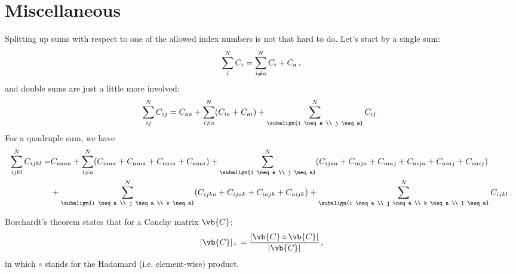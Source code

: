 \section{Miscellaneous}
    Splitting up sums with respect to one of the allowed index numbers is not that hard to do. Let's start by a single sum:
    \begin{equation}
        \sum_i^N C_i = \sum_{i \neq a}^N C_i + C_a \thinspace ,
    \end{equation}
    and double sums are just a little more involved:
    \begin{equation}
        \sum_{ij}^N C_{ij} = C_{aa}+ \sum_{i \neq a}^N (C_{ia} + C_{ai}) + \sum_{\subalign{i \neq a \\ j \neq a}}^N C_{ij} \thinspace .
    \end{equation}
    For a quadruple sum, we have
    \begin{equation}
        \begin{split}
            \sum_{ijkl}^N C_{ijkl} = &C_{aaaa} + \sum_{i \neq a}^N (C_{iaaa} + C_{aiaa} + C_{aaia} + C_{aaai}) + \sum_{\subalign{i \neq a \\ j \neq a}}^N (C_{ijaa} + C_{iaja} + C_{iaaj} + C_{aija} + C_{aiaj} + C_{aaij}) \\
            &+ \sum_{\subalign{i \neq a \\ j \neq a \\ k \neq a}}^N (C_{ijka} + C_{ijak} + C_{iajk} + C_{aijk}) + \sum_{\subalign{i \neq a \\ j \neq a \\ k \neq a \\ l \neq a}}^N C_{ijkl} \thinspace .
        \end{split}
    \end{equation}

    Borchardt's theorem states that for a Cauchy matrix $\vb{C}$:
    \begin{equation}
        |\vb{C}|_+ = \frac{|\vb{C} \circ \vb{C}|}{|\vb{C}|} \thinspace ,
    \end{equation}
    in which $\circ$ stands for the Hadamard (i.e. element-wise) product.
